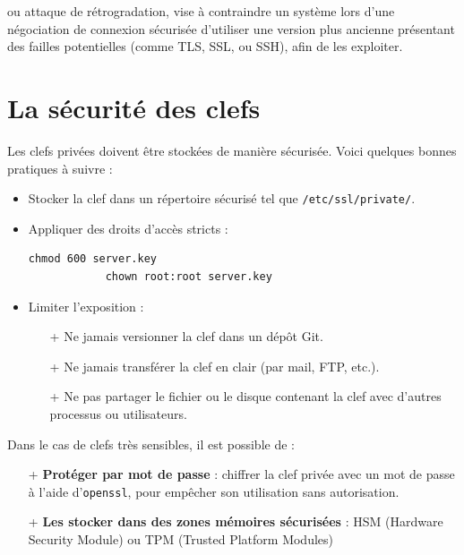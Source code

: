 \documentclass[french, 12pt]{article}%
\newcommand{\itemE}{\item[$\bullet$]}
\newcommand{\titreencadre}{Titre}
\newenvironment{encadre}[1]{\renewcommand{\titreencadre}{#1}
	\begin{mdframed}[style=encadrestyle]
	\vspace{0.5\baselineskip}
	}{%
	\end{mdframed}}
\begin{document}
\begin{encadre}{Downgrade attack.}
ou attaque de rétrogradation, vise à contraindre un système  lors d'une négociation de connexion sécurisée d'utiliser une version plus ancienne présentant des failles potentielles (comme TLS, SSL, ou SSH), afin de les exploiter.
\end{encadre}




\section{La sécurité des clefs}

Les clefs privées doivent être stockées de manière sécurisée. Voici quelques bonnes pratiques à suivre :

\begin{itemize}
\itemE Stocker la clef dans un répertoire sécurisé tel que \verb?/etc/ssl/private/?.
\itemE Appliquer des droits d'accès stricts :
        \begin{lstlisting}[style=commande]
			chmod 600 server.key
			chown root:root server.key
        \end{lstlisting}
\itemE  Limiter l'exposition :
        \begin{itemize}
            \item[+] Ne jamais versionner la clef dans un dépôt Git.
            \item[+] Ne jamais transférer la clef en clair (par mail, FTP, etc.).
            \item[+] Ne pas partager le fichier ou le disque contenant la clef avec d’autres processus ou utilisateurs.
        \end{itemize}
\end{itemize}

Dans le cas de clefs très sensibles, il est possible de : 
    \begin{itemize}
         \item[+] \textbf{Protéger par mot de passe} : chiffrer la clef privée avec un mot de passe à l’aide d’\texttt{openssl}, pour empêcher son utilisation sans autorisation.
        \item[+] \textbf{Les stocker dans des zones mémoires sécurisées } : HSM (Hardware Security Module) 	ou TPM (Trusted Platform Modules)
	\end{itemize}
\end{document}
